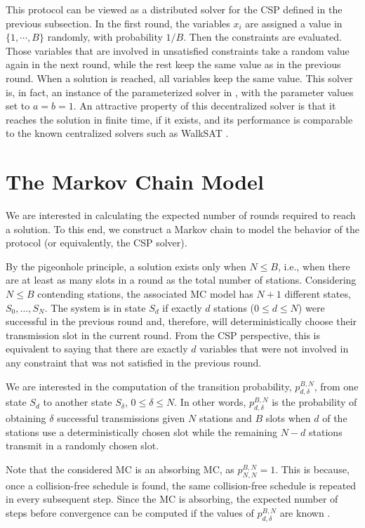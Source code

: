 \documentclass[journal]{IEEEtran}
\begin{document}
This protocol can be viewed as a distributed solver for the CSP defined in the previous subsection. In the first round, the variables $x_i$ are assigned a value in $\{1,\cdots, B \}$ randomly, with probability $1/B$. Then the constraints are evaluated. Those variables that are involved in unsatisfied constraints take a random value again in the next round, while the rest keep the same value as in the previous round. When a solution is reached, all  variables keep the same value. This solver is, in fact, an instance of the parameterized solver in \cite{duffy2011dcs}, with the parameter values set to $a=b=1$. An attractive property of this decentralized solver is that it reaches the solution in finite time, if it exists, and its performance is comparable to the known centralized solvers such as WalkSAT \cite{selman1993lss}.


\section{The Markov Chain Model}
\label{sec:markov_chain}

We are interested in calculating the expected number of rounds required to reach a solution. To this end, we construct a Markov chain to model the behavior of the protocol (or equivalently, the CSP solver). 

By the pigeonhole principle, a solution exists only when $N\leq B$, i.e., when there are at least as many slots in a round as the total number of stations. Considering $N\leq B$ contending stations, the associated MC model has $N+1$ different states, $S_0, \dots, S_N$.
The system is in state $S_d$ if exactly $d$ stations ($0 \leq d \leq N$) were successful in the previous round and, therefore, will deterministically choose their transmission slot in the current round.
From the CSP perspective, this is equivalent to saying that there are exactly $d$ variables that were not involved in any constraint that was not satisfied in the previous round.

We are interested in the computation of the transition probability, $p_{d,\delta}^{B,N}$, from one state $S_d$ to another state $S_\delta$, $0 \leq \delta \leq N$. In other words, $p_{d,\delta}^{B,N}$ is the probability of obtaining $\delta$ successful transmissions given $N$ stations and $B$ slots when $d$ of the stations use a deterministically chosen slot while the remaining $N-d$ stations transmit in a randomly chosen slot.

Note that the considered MC is an absorbing MC, as $p_{N,N}^{B,N}=1$. This is because, once a collision-free schedule is found, the same collision-free schedule is repeated in every subsequent step.
Since the MC is absorbing, the expected number of steps before convergence can be computed if the values of $p_{d,\delta}^{B,N}$ are known \cite{grinstead1997ip}.
\end{document}
